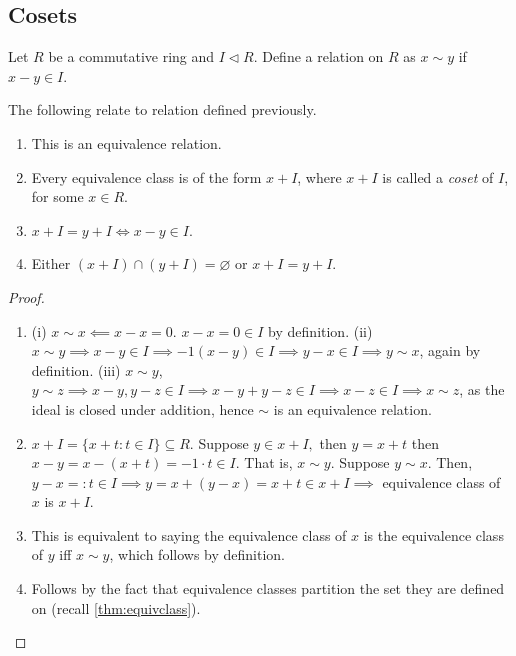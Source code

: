 \documentclass[12pt,oneside]{article}
\begin{document}
\subsection{Cosets}

\begin{definition}
  Let $R$ be a commutative ring and $I \triangleleft R$. Define a relation on $R$ as $x \sim y$ if $x -y \in I$.
\end{definition}

\begin{lemma}
  The following relate to relation defined previously.
  \begin{enumerate}
    \item This is an equivalence relation.
    \item Every equivalence class is of the form $x + I$, where $x+I$ is called a \emph{coset} of $I$, for some $x \in R$.
    \item $x + I = y + I \iff x - y \in I$.
    \item Either $(x+I) \cap (y+I) = \varnothing$ or $x + I = y + I$.
  \end{enumerate}
\end{lemma}

\begin{proof}
  \begin{enumerate}
    \item (i) $x \sim x \impliedby x - x = 0$. $x - x = 0 \in I$ by definition. (ii) $x \sim y \implies x - y \in I \implies -1 (x-y) \in I \implies y-x \in I \implies y \sim x$, again by definition. (iii) $x \sim y$, $y \sim z \implies x -y, y - z \in I \implies x - y +  y - z \in I \implies x -z \in I \implies x \sim z$, as the ideal is closed under addition, hence $\sim$ is an equivalence relation.
    \item $x + I = \{x + t : t \in I\} \subseteq R$. Suppose $y \in x + I,$ then $y = x + t$ then $x - y = x - (x+t) = -1\cdot t \in I$. That is, $x \sim y$. Suppose $y \sim x$. Then, $y - x =: t \in I \implies y = x + (y-x) = x + t \in x+ I \implies $ equivalence class of $x$ is $x + I$.
    \item This is equivalent to saying the equivalence class of $x$ is the equivalence class of $y$ iff $x \sim y$, which follows by definition.
    \item Follows by the fact that equivalence classes partition the set they are defined on (recall \cref{thm:equivclass}).
  \end{enumerate}
\end{proof}
\end{document}
